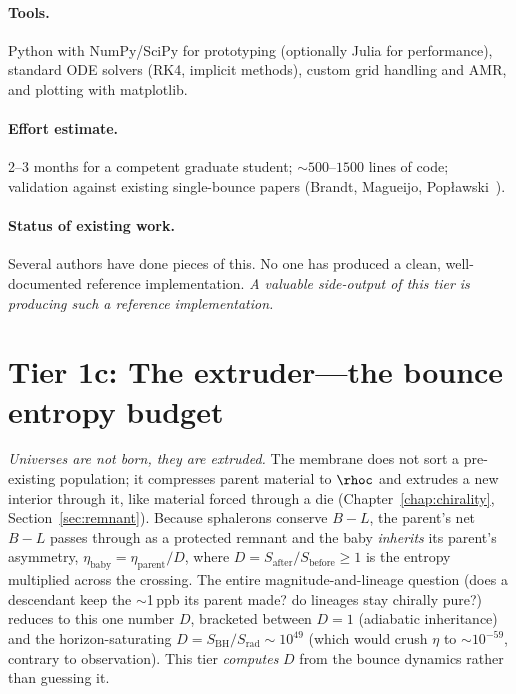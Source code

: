 \paragraph{Tools.} Python with NumPy/SciPy for prototyping (optionally Julia for
performance), standard ODE solvers (RK4, implicit methods), custom grid handling
and AMR, and plotting with matplotlib.

\paragraph{Effort estimate.} 2--3 months for a competent graduate student;
$\sim 500$--$1500$ lines of code; validation against existing single-bounce
papers (Brandt, Magueijo, Pop\l{}awski~\citep{poplawski2012,poplawski2016}).

\paragraph{Status of existing work.} Several authors have done pieces of this. No
one has produced a clean, well-documented reference implementation. \emph{A
valuable side-output of this tier is producing such a reference implementation.}

\section{Tier 1c: The extruder---the bounce entropy budget}
\label{sec:extruder}

\emph{Universes are not born, they are extruded.} The membrane does not sort a
pre-existing population; it compresses parent material to $\rhoc$ and extrudes a
new interior through it, like material forced through a die
(Chapter~\ref{chap:chirality}, Section~\ref{sec:remnant}). Because sphalerons
conserve $B{-}L$, the parent's net $B{-}L$ passes through as a protected remnant
and the baby \emph{inherits} its parent's asymmetry, $\eta_{\mathrm{baby}} =
\eta_{\mathrm{parent}}/D$, where $D = S_{\mathrm{after}}/S_{\mathrm{before}}\ge1$
is the entropy multiplied across the crossing. The entire
magnitude-and-lineage question (does a descendant keep the $\sim$1\,ppb its
parent made? do lineages stay chirally pure?) reduces to this one number $D$,
bracketed between $D=1$ (adiabatic inheritance) and the horizon-saturating
$D=S_{\mathrm{BH}}/S_{\mathrm{rad}}\sim10^{49}$ (which would crush $\eta$ to
$\sim10^{-59}$, contrary to observation). This tier \emph{computes} $D$ from the
bounce dynamics rather than guessing it.

